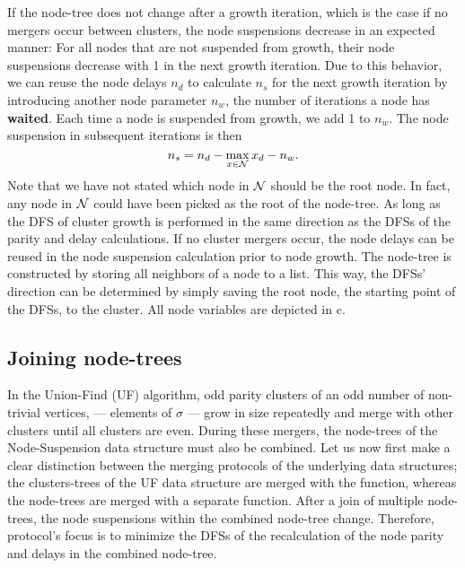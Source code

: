 If the node-tree does not change after a growth iteration, which is the case if no mergers occur between clusters, the node suspensions decrease in an expected manner: For all nodes that are not suspended from growth, their node suspensions decrease with 1 in the next growth iteration. Due to this behavior, we can reuse the node delays $n_d$ to calculate $n_s$ for the next growth iteration by introducing another node parameter $n_w$, the number of iterations a node has \textbf{waited}. Each time a node is suspended from growth, we add 1 to $n_w$. The node suspension in subsequent iterations is then
\begin{equation}\label{eq:suspension}
    n_s = n_d - \max_{x \in \nset}{x_d} - n_w. 
\end{equation}
Note that we have not stated which node in $\mathcal{N}$ should be the root node. In fact, any node in $\mathcal{N}$ could have been picked as the root of the node-tree. As long as the DFS of cluster growth is performed in the same direction as the DFSs of the parity and delay calculations. If no cluster mergers occur, the node delays can be reused in the node suspension calculation prior to node growth. 
The node-tree is constructed by storing all neighbors of a node to a list. This way, the DFSs' direction can be determined by simply saving the root node, the starting point of the DFSs, to the cluster. All node variables are depicted in c. 


\subsection{Joining node-trees}\label{sec:nodejoin}

In the Union-Find (UF) algorithm, odd parity clusters of an odd number of non-trivial vertices, --- elements of $\sigma$ --- grow in size repeatedly and merge with other clusters until all clusters are even. During these mergers, the node-trees of the Node-Suspension data structure must also be combined. Let us now first make a clear distinction between the merging protocols of the underlying data structures; the clusters-trees of the UF data structure are merged with the  function, whereas the node-trees are merged with a separate  function. After a join of multiple node-trees, the node suspensions within the combined node-tree change. Therefore,  protocol's focus is to minimize the DFSs of the recalculation of the node parity and delays in the combined node-tree. 

